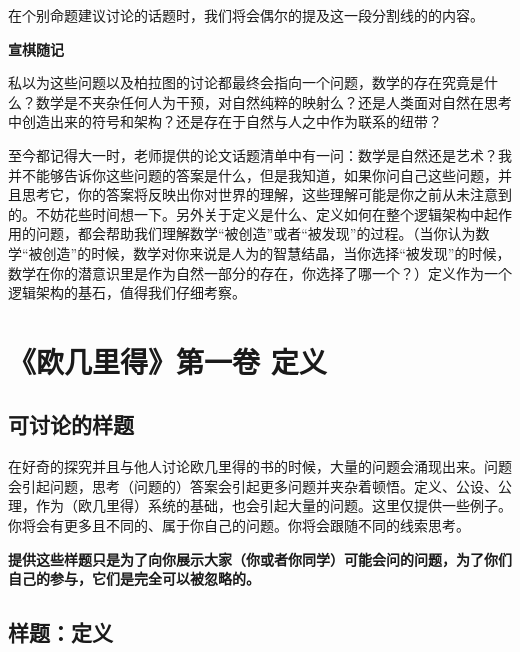 \documentclass[
]{book}
\begin{document}
在个别命题建议讨论的话题时，我们将会偶尔的提及这一段分割线的的内容。

\textbf{宣棋随记}

私以为这些问题以及柏拉图的讨论都最终会指向一个问题，数学的存在究竟是什么？数学是不夹杂任何人为干预，对自然纯粹的映射么？还是人类面对自然在思考中创造出来的符号和架构？还是存在于自然与人之中作为联系的纽带？

至今都记得大一时，老师提供的论文话题清单中有一问：数学是自然还是艺术？我并不能够告诉你这些问题的答案是什么，但是我知道，如果你问自己这些问题，并且思考它，你的答案将反映出你对世界的理解，这些理解可能是你之前从未注意到的。不妨花些时间想一下。另外关于定义是什么、定义如何在整个逻辑架构中起作用的问题，都会帮助我们理解数学``被创造''或者``被发现''的过程。（当你认为数学``被创造''的时候，数学对你来说是人为的智慧结晶，当你选择``被发现''的时候，数学在你的潜意识里是作为自然一部分的存在，你选择了哪一个？）定义作为一个逻辑架构的基石，值得我们仔细考察。

\hypertarget{ux6b27ux51e0ux91ccux5f97ux7b2cux4e00ux5377-ux5b9aux4e49}{%
\chapter{《欧几里得》第一卷 定义}\label{ux6b27ux51e0ux91ccux5f97ux7b2cux4e00ux5377-ux5b9aux4e49}}

\hypertarget{ux53efux8ba8ux8bbaux7684ux6837ux9898}{%
\section*{可讨论的样题}\label{ux53efux8ba8ux8bbaux7684ux6837ux9898}}

在好奇的探究并且与他人讨论欧几里得的书的时候，大量的问题会涌现出来。问题会引起问题，思考（问题的）答案会引起更多问题并夹杂着顿悟。定义、公设、公理，作为（欧几里得）系统的基础，也会引起大量的问题。这里仅提供一些例子。你将会有更多且不同的、属于你自己的问题。你将会跟随不同的线索思考。

\textbf{提供这些样题只是为了向你展示大家（你或者你同学）可能会问的问题，为了你们自己的参与，它们是完全可以被忽略的。}

\hypertarget{ux6837ux9898ux5b9aux4e49}{%
\section*{样题：定义}\label{ux6837ux9898ux5b9aux4e49}}
\end{document}
